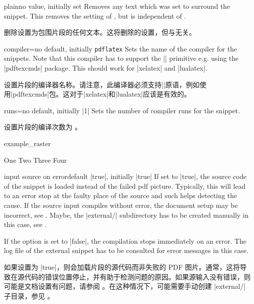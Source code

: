 \begin{extTcbKey}[][doc new=2015-03-11]{plain}{}{no value, initially set}
Removes any text which was set to surround the snippet.
This removes the setting of  , but is
independent of .

删除设置为包围片段的任何文本。这将删除的设置，但与无关。
\end{extTcbKey}


\begin{extTcbKey}[][doc new=2015-03-11]{compiler}{=}{no default,
initially \texttt{pdflatex}}
Sets the name of the compiler for the snippets. Note that this compiler
has to support the |\pdfmdfivesum| primitive e.g. using the
|pdftexcmds| package. This should work for |xelatex| and |lualatex|.

设置片段的编译器名称。请注意，此编译器必须支持|\pdfmdfivesum|原语，例如使用|pdftexcmds|包。这对于|xelatex|和|lualatex|应该是有效的。
\end{extTcbKey}

\begin{extTcbKey}[][doc new=2015-03-11]{runs}{=}{no default,
  initially |1|}
Sets the number of compiler runs for the snippet.

设置片段的编译次数为 。
\begin{dispExample}
\begin{tcbexternal}[minipage,runs=2]{example_raster}
  \begin{tcbitemize}[raster equal height,
      size=small,colframe=red!50!black,colback=red!10!white]
    \tcbitem One
    \tcbitem \Huge Two
    \tcbitem Three
    \tcbitem Four
  \end{tcbitemize}
\end{tcbexternal}
\end{dispExample}
\end{extTcbKey}

\enlargethispage*{1cm}
\begin{extTcbKey}[][doc new=2015-03-11]{input source on error}{}{default |true|,
  initially |true|}
If set to |true|, the source code of the snippet is loaded instead of
the failed pdf picture. Typically, this will lead to an error stop at the
faulty place of the source and such helps detecting the cause.
If the source input compiles without error, the document setup
may be incorrect, see .
Maybe, the |external/| subdirectory has to be created manually in this case,
see .\par
If the option is set to |false|, the compilation stops immediately on an error.
The log file of the external snippet has to be consulted for error messages
in this case.

如果设置为 |true|，则会加载片段的源代码而非失败的 PDF 图片。通常，这将导致在源代码的错误位置停止，并有助于检测问题的原因。如果源输入没有错误，则可能是文档设置有问题，请参阅 。在这种情况下，可能需要手动创建 |external/| 子目录，参见 。
\end{extTcbKey}



